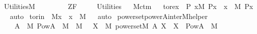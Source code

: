 %
\begin{isabellebody}%
%
%
\isadelimtheory
%
\endisadelimtheory
%
\isatagtheory
{}\isamarkupfalse%
\ Utilities{\isacharunderscore}{\kern0pt}M\ \isanewline
\ \ \ \isanewline
\ \ \ \ ZF\ \isanewline
\ \ \ \ Utilities\isanewline
{}%
\endisatagtheory
{\isafoldtheory}%
%
\isadelimtheory
\ \isanewline
%
\endisadelimtheory
\isanewline
{}\isamarkupfalse%
\ M{\isacharunderscore}{\kern0pt}ctm\isanewline
{}\ \isanewline
\isanewline
{}\isamarkupfalse%
\ to{\isacharunderscore}{\kern0pt}rex\ {\isacharcolon}{\kern0pt}\ {\isachardoublequoteopen}{\isasymAnd}P{\isachardot}{\kern0pt}\ {\isasymexists}x{\isacharbrackleft}{\kern0pt}{\isacharhash}{\kern0pt}{\isacharhash}{\kern0pt}M{\isacharbrackright}{\kern0pt}{\isachardot}{\kern0pt}\ P{\isacharparenleft}{\kern0pt}x{\isacharparenright}{\kern0pt}\ {\isasymLongrightarrow}\ {\isasymexists}x\ {\isasymin}\ M{\isachardot}{\kern0pt}\ P{\isacharparenleft}{\kern0pt}x{\isacharparenright}{\kern0pt}{\isachardoublequoteclose}%
\isadelimproof
\ %
\endisadelimproof
%
\isatagproof
{}\isamarkupfalse%
\ auto%
\endisatagproof
{\isafoldproof}%
%
\isadelimproof
%
\endisadelimproof
\isanewline
{}\isamarkupfalse%
\ to{\isacharunderscore}{\kern0pt}rin\ {\isacharcolon}{\kern0pt}\ {\isachardoublequoteopen}{\isacharparenleft}{\kern0pt}{\isacharhash}{\kern0pt}{\isacharhash}{\kern0pt}M{\isacharparenright}{\kern0pt}{\isacharparenleft}{\kern0pt}x{\isacharparenright}{\kern0pt}\ {\isasymLongrightarrow}\ x\ {\isasymin}\ M{\isachardoublequoteclose}%
\isadelimproof
\ %
\endisadelimproof
%
\isatagproof
{}\isamarkupfalse%
\ auto%
\endisatagproof
{\isafoldproof}%
%
\isadelimproof
%
\endisadelimproof
\isanewline
\isanewline
{}\isamarkupfalse%
\ powerset{\isacharunderscore}{\kern0pt}powerA{\isacharunderscore}{\kern0pt}inter{\isacharunderscore}{\kern0pt}M{\isacharunderscore}{\kern0pt}helper\isanewline
\ \ {\isacharcolon}{\kern0pt}\ {\isachardoublequoteopen}{\isasymforall}\ A\ {\isasymin}\ M{\isachardot}{\kern0pt}\ {\isacharparenleft}{\kern0pt}Pow{\isacharparenleft}{\kern0pt}A{\isacharparenright}{\kern0pt}\ {\isasyminter}\ M{\isacharparenright}{\kern0pt}\ {\isasymin}\ M\ {\isasymand}\ {\isacharparenleft}{\kern0pt}{\isasymforall}\ X\ {\isasymin}\ M{\isachardot}{\kern0pt}\ powerset{\isacharparenleft}{\kern0pt}{\isacharhash}{\kern0pt}{\isacharhash}{\kern0pt}M{\isacharcomma}{\kern0pt}\ A{\isacharcomma}{\kern0pt}\ X{\isacharparenright}{\kern0pt}\ {\isasymlongrightarrow}\ X\ {\isacharequal}{\kern0pt}\ {\isacharparenleft}{\kern0pt}Pow{\isacharparenleft}{\kern0pt}A{\isacharparenright}{\kern0pt}\ {\isasyminter}\ M{\isacharparenright}{\kern0pt}{\isacharparenright}{\kern0pt}{\isachardoublequoteclose}\ \isanewline

\end{isabellebody}
